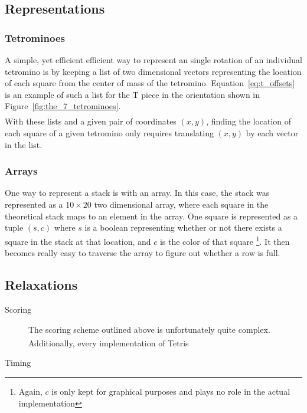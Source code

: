 \documentclass[ fontsize=11pt]{article}
\def\tetris{Tetris\textsuperscript{\textregistered}}
\begin{document}
\subsection{Representations}
\label{sub:representations}
\subsubsection{Tetrominoes}
\label{ssub:tetrominoes}

\par A simple, yet efficient efficient way to represent an single rotation of an individual tetromino is by keeping a list of two dimensional vectors representing the location of each square from the center of mass of the tetromino. Equation~\ref{eq:t_offsets} is an example of such a list for the T piece in the orientation shown in Figure~\ref{fig:the_7_tetrominoes}.
\begin{align}
  [(0,0), (-1, 0), (0, 1), (1, 0)]\label{eq:t_offsets}
\end{align}
With these lists and a given pair of coordinates $(x,y)$, finding the location of each square of a given tetromino only requires translating $(x,y)$ by each vector in the list.

\subsubsection{Arrays}
\label{ssub:array}
\par One way to represent a stack is with an array. In this case, the stack was represented as a $10\times 20$ two dimensional array, where each square in the theoretical stack maps to an element in the array. One square is represented as a tuple $(s,c)$ where $s$ is a boolean representing whether or not there exists a square in the stack at that location, and $c$ is the color of that square \footnote{Again, $c$ is only kept for graphical purposes and plays no role in the actual implementation}. It then becomes really easy to traverse the array to figure out whether a row is full.


\subsection{Relaxations}
\label{sub:relaxations}
\begin{description}
  \item[Scoring] The scoring scheme outlined above is unfortunately quite complex. Additionally, every implementation of \tetris{}
  \item[Timing]
\end{description}
\end{document}
